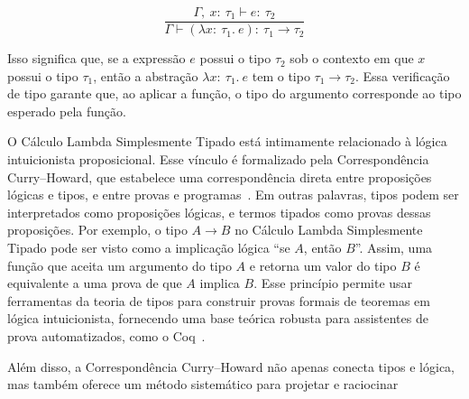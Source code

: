 \[
  \frac{\Gamma,\ x{:}\ \tau_1 \vdash e{:}\ \tau_2}{\Gamma \vdash (\lambda x{:}\ \tau_1.\ e){:}\ \tau_1 \to \tau_2}
\]

Isso significa que, se a expressão $e$ possui o tipo $\tau_2$ sob o contexto em que $x$ possui o tipo $\tau_1$, então a abstração $\lambda x{:}\ \tau_1.\ e$ tem o tipo $\tau_1 \to \tau_2$.
Essa verificação de tipo garante que, ao aplicar a função, o tipo do argumento corresponde ao tipo esperado pela função.

O Cálculo Lambda Simplesmente Tipado está intimamente relacionado à lógica intuicionista proposicional.
Esse vínculo é formalizado pela Correspondência Curry–Howard, que estabelece uma correspondência direta entre proposições lógicas e tipos, e entre provas e programas~\cite{pierce2002types}.
Em outras palavras, tipos podem ser interpretados como proposições lógicas, e termos tipados como provas dessas proposições.
Por exemplo, o tipo $A \to B$ no Cálculo Lambda Simplesmente Tipado pode ser visto como a implicação lógica “se $A$, então $B$”.
Assim, uma função que aceita um argumento do tipo $A$ e retorna um valor do tipo $B$ é equivalente a uma prova de que $A$ implica $B$.
Esse princípio permite usar ferramentas da teoria de tipos para construir provas formais de teoremas em lógica intuicionista, fornecendo uma base teórica robusta para assistentes de prova automatizados, como o Coq~\cite{coquand1988calculus}.

Além disso, a Correspondência Curry–Howard não apenas conecta tipos e lógica, mas também oferece um método sistemático para projetar e raciocinar
